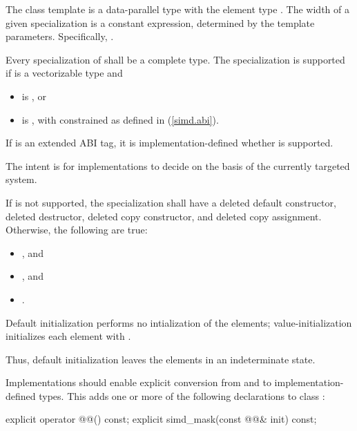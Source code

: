 \begin{wgText}
\pnum
The class template  is a data-parallel type with the element type . The width of a given  specialization is a constant expression, determined by the template parameters. Specifically, .

\pnum
Every specialization of  shall be a complete type. The specialization  is supported if  is a vectorizable type and
\begin{itemize}
  \item {} is , or
  \item {} is , with  constrained as defined in (\ref{simd.abi}).
\end{itemize}

If  is an extended ABI tag, it is implementation-defined whether  is supported. \begin{note}The intent is for implementations to decide on the basis of the currently targeted system.\end{note}

If  is not supported, the specialization shall have a deleted default constructor, deleted destructor, deleted copy constructor, and deleted copy assignment.
Otherwise, the following are true:
\begin{itemize}
  \item {}, and
  \item {}, and
  \item {}.
\end{itemize}

\pnum
Default initialization performs no intialization of the elements; value-initialization initializes each element with . \begin{note}Thus, default initialization leaves the elements in an indeterminate state.\end{note}

\pnum
Implementations should enable explicit conversion from and to implementation-defined types. This adds one or more of the following declarations to class :

\begin{codeblock}
explicit operator @@() const;
explicit simd_mask(const @@& init) const;
\end{codeblock}


\end{wgText}
